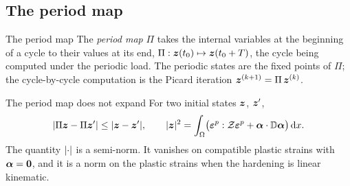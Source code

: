\subsection{The period map}
\begin{gbox}{The period map}\label{def:cy-period}
The \emph{period map} $\Pi$ takes the internal variables at the beginning of a
cycle to their values at its end, $\Pi:\bm{z}(t_0)\mapsto\bm{z}(t_0+T)$, the cycle
being computed under the periodic load. The periodic states are the fixed
points of $\Pi$; the cycle-by-cycle computation is the Picard iteration
$\bm{z}^{(k+1)}=\Pi\,\bm{z}^{(k)}$.
\end{gbox}

\begin{gbox}{The period map does not expand}\label{prop:cy-nonexp}
For two initial states $\bm{z}$, $\bm{z}'$,
\[
  \lvert \Pi\bm{z}-\Pi\bm{z}'\rvert\le\lvert \bm{z}-\bm{z}'\rvert,\qquad
  \lvert \bm{z}\rvert^2=\int_\Omega\bigl(\bm{\varepsilon}^{p}:\mathcal{Z}\bm{\varepsilon}^{p}+\bm{\alpha}\cdot\mathbb{D}\bm{\alpha}\bigr)\,\mathrm{d} x .
\]
The quantity $\lvert \cdot\rvert$ is a semi-norm. It vanishes on compatible plastic
strains with $\bm{\alpha}=\bm{0}$, and it is a norm on the plastic strains when
the hardening is linear kinematic.
\end{gbox}
